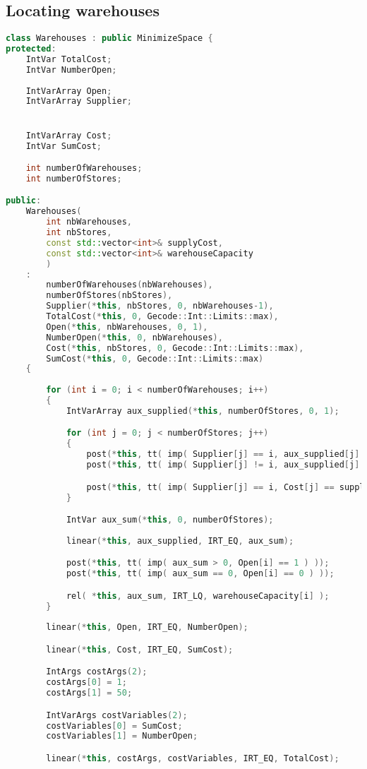 \subsection{Locating warehouses}
\begin{lstlisting}[language=C++]
class Warehouses : public MinimizeSpace {
protected: 
	IntVar TotalCost;
	IntVar NumberOpen;
	
	IntVarArray Open;
	IntVarArray Supplier;


	IntVarArray Cost;
	IntVar SumCost;

	int numberOfWarehouses;
	int numberOfStores;

public:
	Warehouses(
		int nbWarehouses,
		int nbStores,
		const std::vector<int>& supplyCost, 
		const std::vector<int>& warehouseCapacity
		) 
	: 
		numberOfWarehouses(nbWarehouses),
		numberOfStores(nbStores),
		Supplier(*this, nbStores, 0, nbWarehouses-1),
		TotalCost(*this, 0, Gecode::Int::Limits::max),
		Open(*this, nbWarehouses, 0, 1),
		NumberOpen(*this, 0, nbWarehouses),
		Cost(*this, nbStores, 0, Gecode::Int::Limits::max),
		SumCost(*this, 0, Gecode::Int::Limits::max)
	{
		
		for (int i = 0; i < numberOfWarehouses; i++)
		{
			IntVarArray aux_supplied(*this, numberOfStores, 0, 1);

			for (int j = 0; j < numberOfStores; j++)
			{
				post(*this, tt( imp( Supplier[j] == i, aux_supplied[j] == 1) ));
				post(*this, tt( imp( Supplier[j] != i, aux_supplied[j] == 0) ));

				post(*this, tt( imp( Supplier[j] == i, Cost[j] == supplyCost[i + j * numberOfWarehouses]) ));
			}

			IntVar aux_sum(*this, 0, numberOfStores);
			
			linear(*this, aux_supplied, IRT_EQ, aux_sum);

			post(*this, tt( imp( aux_sum > 0, Open[i] == 1 ) ));
			post(*this, tt( imp( aux_sum == 0, Open[i] == 0 ) ));

			rel( *this, aux_sum, IRT_LQ, warehouseCapacity[i] );
		}
		
		linear(*this, Open, IRT_EQ, NumberOpen);

		linear(*this, Cost, IRT_EQ, SumCost);

		IntArgs costArgs(2);
		costArgs[0] = 1;
		costArgs[1] = 50;

		IntVarArgs costVariables(2);
		costVariables[0] = SumCost;
		costVariables[1] = NumberOpen;

		linear(*this, costArgs, costVariables, IRT_EQ, TotalCost);
		

\end{lstlisting}
